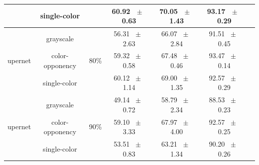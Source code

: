 \begin{table}[h]
\begin{tabular}{@{}lccc ccc@{}}
    & single-color & & 60.92 ~$\pm$~ 0.63 & 70.05 ~$\pm$~ 1.43 & 93.17 ~$\pm$~ 0.29 \\
    \midrule
    \multirow{3}{*}{upernet} & grayscale & \multirow{3}{*}{80\%} & 56.31 ~$\pm$~ 2.63 & 66.07 ~$\pm$~ 2.84 & 91.51 ~$\pm$~ 0.45 \\
    & color-opponency & & 59.32 ~$\pm$~ 0.58 & 67.48 ~$\pm$~ 0.46 & 93.47 ~$\pm$~ 0.14 \\
    & single-color & & 60.12 ~$\pm$~ 1.14 & 69.00 ~$\pm$~ 1.35 & 92.57 ~$\pm$~ 0.29 \\
    \midrule
    \multirow{3}{*}{upernet} & grayscale & \multirow{3}{*}{90\%} & 49.14 ~$\pm$~ 0.72 & 58.79 ~$\pm$~ 2.34 & 88.53 ~$\pm$~ 0.23 \\
    & color-opponency & & 59.10 ~$\pm$~ 3.33 & 67.97 ~$\pm$~ 4.00 & 92.57 ~$\pm$~ 0.25 \\
    & single-color & & 53.51 ~$\pm$~ 0.83 & 63.21 ~$\pm$~ 1.34 & 90.20 ~$\pm$~ 0.26 \\
    \midrule
    \bottomrule
  \end{tabular}
  \label{tab:sparse_upernet_cityscapes}
\end{table}